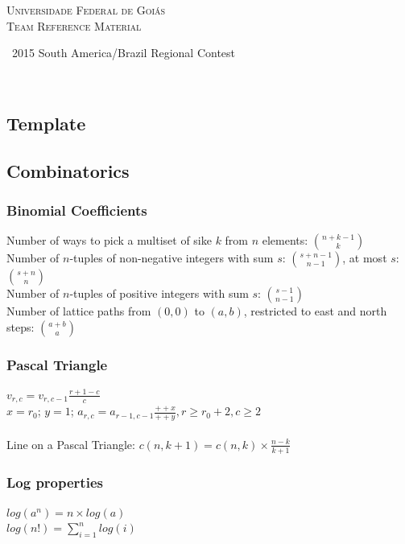 \documentclass[a4paper,12pt]{article}
\newcommand\includesfile[4]{
  \subsection{#2}
  \begin{multicols}{2}
    
  \end{multicols}
}
\begin{document}
\thispagestyle{fancy}
\begin{center}
  \Huge\textsc{Universidade Federal de Goiás \\ Team Reference Material}
  
  \
  \small 2015 South America/Brazil Regional Contest
\end{center}

\begin{multicols}{2}
  \tableofcontents
\end{multicols}

\

\includesfile{c++}{Template}{config}{template.cpp}

\newpage

\subsection{Combinatorics}
\subsubsection{Binomial Coefficients}

Number of ways to pick a multiset of sike $k$ from $n$ elements: $\binom{n+k-1}{k}$\\
Number of $n$-tuples of non-negative integers with sum $s$: $\binom{s+n-1}{n-1}$, at most $s$: $\binom{s+n}{n}$\\
Number of $n$-tuples of positive integers with sum $s$: $\binom{s-1}{n-1}$\\
Number of lattice paths from $(0,0)$ to $(a,b)$, restricted to east and north steps: $\binom{a+b}{a}$

\subsubsection{Pascal Triangle}

$v_{r,c} = v_{r,c-1} \frac{r+1-c}{c}$ \\
$x = r_0$; $y = 1$; $a_{r,c} = a_{r-1,c-1}  \frac{++x}{++y}, r \geq r_0+2, c \geq 2$ \\ \\
Line on a Pascal Triangle: $c(n, k+1) = c(n, k) \times \frac{n-k}{k+1}$

\subsubsection{Log properties}
$log(a^n) = n \times log(a)$ \\
$log(n!) = \sum_{i=1}^{n} log(i)$
\end{document}
